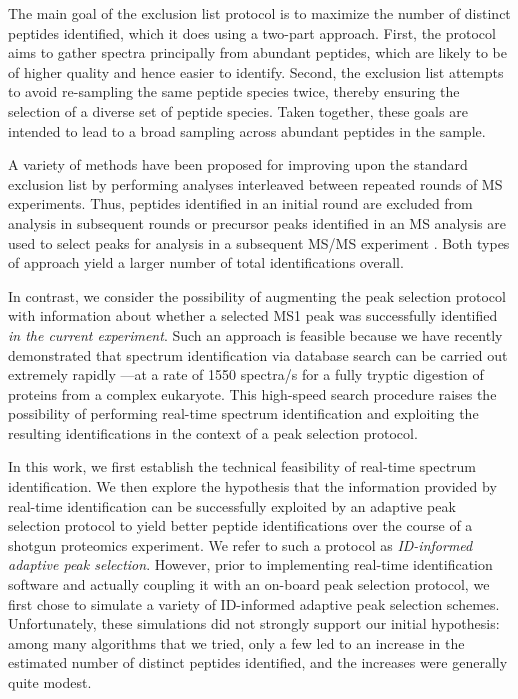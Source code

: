 \documentclass[12pt]{article}
\begin{document}
The main goal of the exclusion list protocol is to maximize the number
of distinct peptides identified, which it does using a two-part
approach. First, the protocol aims to gather spectra principally from
abundant peptides, which are likely to be of higher quality and hence
easier to identify.  Second, the exclusion list attempts to avoid
re-sampling the same peptide species twice, thereby ensuring the
selection of a diverse set of peptide species. Taken together, these
goals are intended to lead to a broad sampling across abundant
peptides in the sample.

A variety of methods have been proposed for improving upon the
standard exclusion list by performing analyses interleaved between
repeated rounds of MS experiments.  Thus, peptides identified in an
initial round are excluded from analysis in subsequent rounds
\cite{chen:enhanced, wang:exploring, bendall:enhanced,
  scherl:nonredundant} or precursor peaks identified in an MS analysis
are used to select peaks for analysis in a subsequent MS/MS experiment
\cite{rinner:integrated, picotti:implications, schmidt:integrated,
  zerck:iterative, hoopmann:post}.  Both types of approach yield a
larger number of total identifications overall.

In contrast, we consider the possibility of augmenting the peak
selection protocol with information about whether a selected MS1 peak
was successfully identified {\em in the current experiment}.  Such an
approach is feasible because we have recently demonstrated that
spectrum identification via database search can be carried out
extremely rapidly \cite{diament:faster}---at a rate of 1550 spectra/s
for a fully tryptic digestion of proteins from a complex eukaryote.
This high-speed search procedure raises the possibility of performing
real-time spectrum identification and exploiting the resulting
identifications in the context of a peak selection protocol.

In this work, we first establish the technical feasibility of
real-time spectrum identification.  We then explore the hypothesis
that the information provided by real-time identification can be
successfully exploited by an adaptive peak selection protocol to yield
better peptide identifications over the course of a shotgun proteomics
experiment.  We refer to such a protocol as {\em ID-informed adaptive
  peak selection}.  However, prior to implementing real-time
identification software and actually coupling it with an on-board peak
selection protocol, we first chose to simulate a variety of
ID-informed adaptive peak selection schemes.  Unfortunately, these
simulations did not strongly support our initial hypothesis: among
many algorithms that we tried, only a few led to an increase in the
estimated number of distinct peptides identified, and the increases
were generally quite modest.
\end{document}
